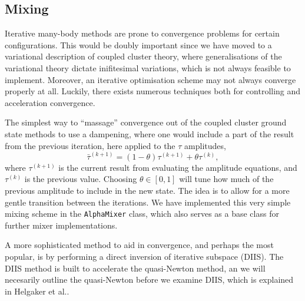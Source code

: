 \subsection{Mixing}

    Iterative many-body methods are prone to convergence problems for certain configurations.
    This would be doubly important since we have moved to a variational description 
    of coupled cluster theory,
    where generalisations of the variational theory dictate inifitesimal variations, which 
    is not always feasible to implement.
    Moreover, an iterative optimisation scheme may not always converge properly at all. 
    Luckily, there exists numerous techniques both for controlling and acceleration 
    convergence.

    The simplest way to ``massage'' convergence out of the coupled cluster ground state methods
    to use a dampening, where one would include a part of the result from the previous 
    iteration, here applied to the $\tau$ amplitudes,
    \begin{equation}
        \bar{\tau}^{(k+1)} = (1 - \theta)\tau^{(k+1)} + \theta\tau^{(k)},
    \end{equation}
    where $\tau^{(k+1)}$ is the current result from evaluating the amplitude equations, 
    and $\tau^{(k)}$ is the previous value. Choosing $\theta \in [0,1]$ will tune how
    much of the previous amplitude to include in the new state. The idea is to allow for 
    a more gentle transition between the iterations. We have implemented this 
    very simple mixing scheme in the \lstinline{AlphaMixer} class, which also serves as 
    a base class for further mixer implementations.

    

    A more sophisticated method to aid in convergence, and perhaps the most popular,
    is by performing a direct inversion of iterative subspace (DIIS). The DIIS method 
    is built to accelerate the quasi-Newton method, an we will necesarily outline the 
    quasi-Newton before we examine DIIS, which is explained in Helgaker et 
    al.\cite{helgaker2014molecular}.

